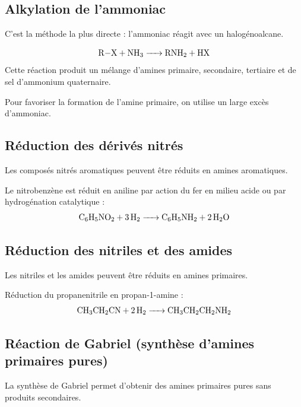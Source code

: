 \subsection{Alkylation de l'ammoniac}

C'est la méthode la plus directe : l'ammoniac réagit avec un halogénoalcane.

\begin{loi}
\[\ce{R-X + NH3 -> RNH2 + HX}\]
Cette réaction produit un mélange d'amines primaire, secondaire, tertiaire et de sel d'ammonium quaternaire.
\end{loi}

\begin{remarque}
Pour favoriser la formation de l'amine primaire, on utilise un large excès d'ammoniac.
\end{remarque}

\subsection{Réduction des dérivés nitrés}

Les composés nitrés aromatiques peuvent être réduits en amines aromatiques.

\begin{experience}
Le nitrobenzène  est réduit en aniline  par action du fer en milieu acide ou par hydrogénation catalytique :
\[\ce{C6H5NO2 + 3H2 -> C6H5NH2 + 2H2O}\]
\end{experience}

\subsection{Réduction des nitriles et des amides}

Les nitriles et les amides peuvent être réduits en amines primaires.

\begin{exemple}
Réduction du propanenitrile en propan-1-amine :
\[\ce{CH3CH2CN + 2H2 -> CH3CH2CH2NH2}\]
\end{exemple}

\subsection{Réaction de Gabriel (synthèse d'amines primaires pures)}

La synthèse de Gabriel permet d'obtenir des amines primaires pures sans produits secondaires.

